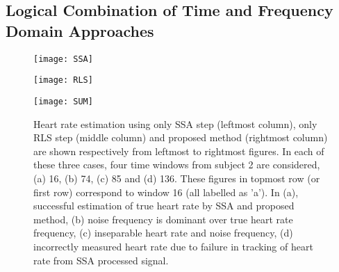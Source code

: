 \documentclass[final,3p,times,authoryear]{elsarticle}
\begin{document}
\subsection{Logical Combination of Time and Frequency Domain Approaches}

\begin{figure*}[ht]
\begin{subfloat}
  \centering
  \texttt{[image: SSA]}
\end{subfloat}
\begin{subfloat}
  \centering
  \texttt{[image: RLS]}
\end{subfloat}
\begin{subfloat}
  \centering
  \texttt{[image: SUM]}
  \caption{ Heart rate estimation using only SSA step (leftmost column), only RLS step (middle column) and proposed method (rightmost column) are shown respectively from leftmost to rightmost figures. In each of these three cases, four time windows from subject 2 are considered, (a) 16, (b) 74, (c) 85 and (d) 136. These figures in topmost row (or first row) correspond to window 16 (all labelled as 'a'). In (a), successful estimation of true heart rate by SSA and proposed method, (b) noise frequency is dominant over true heart rate frequency, (c) inseparable heart rate and noise frequency, (d) incorrectly measured heart rate due to failure in tracking of heart rate from SSA processed signal. 
 }
  \label{Fig:RLS_SSA}
  \end{subfloat}
\end{figure*}
\end{document}
